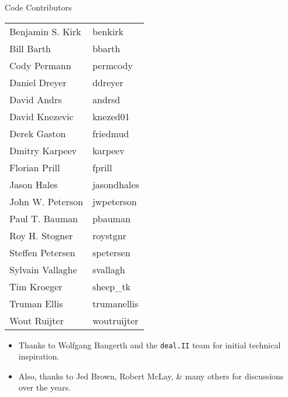 \begin{frame}[shrink]
  \begin{block}{Code Contributors}
    \scriptsize
    \begin{center}
      \begin{tabular}{|l|l|} \hline
        Benjamin S. Kirk & benkirk \\
        Bill Barth       & bbarth \\
        Cody Permann     & permcody \\
        Daniel Dreyer    & ddreyer \\
        David Andrs      & andrsd \\
        David Knezevic   & knezed01 \\
        Derek Gaston     & friedmud \\
        Dmitry Karpeev   & karpeev \\
        Florian Prill    & fprill \\
        Jason Hales      & jasondhales \\
        John W. Peterson & jwpeterson \\
        Paul T. Bauman   & pbauman \\
        Roy H. Stogner   & roystgnr \\
        Steffen Petersen & spetersen \\
        Sylvain Vallaghe & svallagh \\
        Tim Kroeger      & sheep\_tk \\
        Truman Ellis     & trumanellis \\
        Wout Ruijter     & woutruijter \\ \hline
      \end{tabular}
    \end{center}
    \begin{itemize}
      \item Thanks to Wolfgang Bangerth and the \texttt{deal.II} team for initial technical inspiration.
      \item Also, thanks to Jed Brown, Robert McLay, \& many others for discussions over the years.
    \end{itemize}
  \end{block}
\end{frame}
